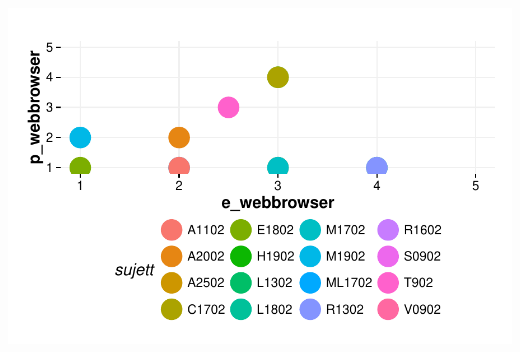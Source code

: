 \documentclass{article}
\begin{document}
\includegraphics{interviews/interviews-plot_coirs_parent_enfant_webbrowser}
\end{document}
